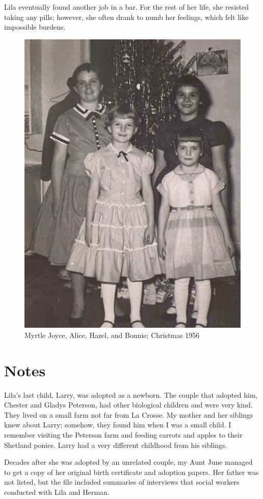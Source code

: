 \documentclass[
  letterpaper,
]{book}
\begin{document}
Lila eventually found another job in a bar. For the rest of her life,
she resisted taking any pills; however, she often drank to numb her
feelings, which felt like impossible burdens.

\begin{figure}[H]

{\centering \includegraphics[width=0.55\linewidth,height=\textheight,keepaspectratio]{images/Akou26rt.jpg}

}

\caption{Myrtle Joyce, Alice, Hazel, and Bonnie; Christmas 1956}

\end{figure}%

\section{Notes}\label{notes-58}

Lila's last child, Larry, was adopted as a newborn. The couple that
adopted him, Chester and Gladys Peterson, had other biological children
and were very kind. They lived on a small farm not far from La Crosse.
My mother and her siblings knew about Larry; somehow, they found him
when I was a small child. I remember visiting the Peterson farm and
feeding carrots and apples to their Shetland ponies. Larry had a very
different childhood from his siblings.

Decades after she was adopted by an unrelated couple, my Aunt June
managed to get a copy of her original birth certificate and adoption
papers. Her father was not listed, but the file included summaries of
interviews that social workers conducted with Lila and Herman.
\end{document}
